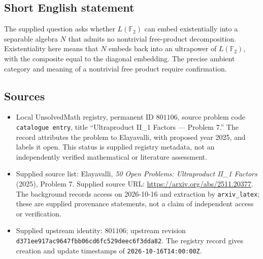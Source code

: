 \documentclass[11pt]{article}
\begin{document}
\subsection{Short English statement}
The supplied question asks whether \(L(\mathbb F_2)\) can embed existentially into a separable algebra \(N\) that admits no nontrivial free-product decomposition. Existentiality here means that \(N\) embeds back into an ultrapower of \(L(\mathbb F_2)\), with the composite equal to the diagonal embedding. The precise ambient category and meaning of a nontrivial free product require confirmation.
\subsection{Sources}
\begin{itemize}
\item Local UnsolvedMath registry, permanent ID \(801106\), source problem code \texttt{catalogue entry}, title ``Ultraproduct II\_1 Factors --- Problem 7.'' The record attributes the problem to Elayavalli, with proposed year 2025, and labels it open. This status is supplied registry metadata, not an independently verified mathematical or literature assessment.
\item Supplied source list: Elayavalli, \emph{50 Open Problems: Ultraproduct II\_1 Factors} (2025), Problem 7. Supplied source URL: \url{https://arxiv.org/abs/2511.20377}. The background records access on 2026-10-16 and extraction by \texttt{arxiv\_latex}; these are supplied provenance statements, not a claim of independent access or verification.
\item Supplied upstream identity: \(801106\); upstream revision \texttt{d371ee917ac9647fbb06cd6fc529deec6f3dda82}. The registry record gives creation and update timestamps of \texttt{2026-10-16T14:00:00Z}.
\end{itemize}
\end{document}
